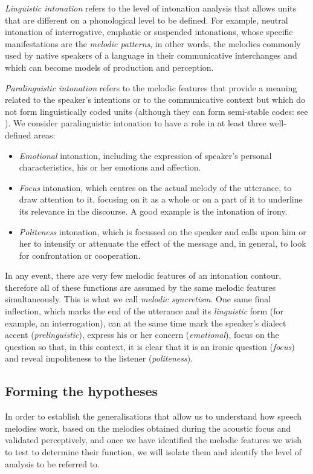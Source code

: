 \documentclass[output=paper]{langscibook}
\begin{document}
\textit{Linguistic intonation} refers to the level of intonation analysis that allows units that are different on a phonological level to be defined. For example, neutral intonation of interrogative, emphatic or suspended intonations, whose specific manifestations are the \textit{melodic patterns}, in other words, the melodies commonly used by native speakers of a language in their communicative interchanges and which can become models of production and perception.

\textit{Paralinguistic intonation} refers to the melodic features that provide a meaning related to the speaker's intentions or to the communicative context but which do not form linguistically coded units (although they can form semi-stable codes: see \citealt{CanteroSerena.2014}). We consider paralinguistic intonation to have a role in at least three well-defined areas:

\begin{itemize}
\item \textit{Emotional} intonation, including the expression of speaker's personal characteristics, his or her emotions and affection.
\item \textit{Focus} intonation, which centres on the actual melody of the utterance, to draw attention to it, focusing on it as a whole or on a part of it to underline its relevance in the discourse. A good example is the intonation of irony.
\item \textit{Politeness} intonation, which is focussed on the speaker and calls upon him or her to intensify or attenuate the effect of the message and, in general, to look for confrontation or cooperation.
\end{itemize}

In any event, there are very few melodic features of an intonation contour, therefore all of these functions are assumed by the same melodic features simultaneously. This is what we call \textit{melodic syncretism}. One same final inflection, which marks the end of the utterance and its \textit{linguistic} form (for example, an interrogation), can at the same time mark the speaker's dialect accent (\textit{prelinguistic}), express his or her concern (\textit{emotional}), focus on the question so that, in this context, it is clear that it is an ironic question (\textit{focus}) and reveal impoliteness to the listener (\textit{politeness}).

\subsection{Forming the hypotheses}
In order to establish the generalisations that allow us to understand how speech melodies work, based on the melodies obtained during the acoustic focus and validated perceptively, and once we have identified the melodic features we wish to test to determine their function, we will isolate them and identify the level of analysis to be referred to.
\end{document}
